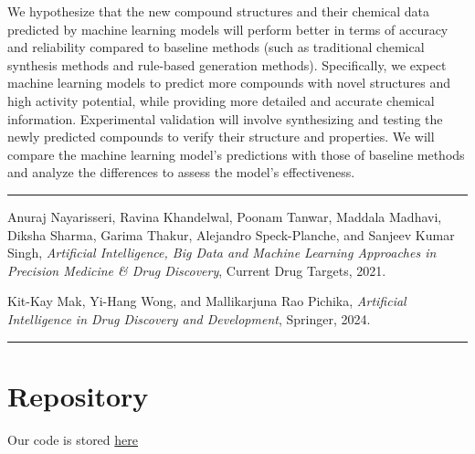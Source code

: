 \documentclass{ctexart}
\begin{document}
We hypothesize that the new compound structures and their chemical data predicted by machine learning models will perform better in terms of accuracy and reliability compared to baseline methods (such as traditional chemical synthesis methods and rule-based generation methods). Specifically, we expect machine learning models to predict more compounds with novel structures and high activity potential, while providing more detailed and accurate chemical information. Experimental validation will involve synthesizing and testing the newly predicted compounds to verify their structure and properties. We will compare the machine learning model’s predictions with those of baseline methods and analyze the differences to assess the model's effectiveness.
\vspace{1em}
\hrule
\begin{thebibliography}{9}

    Anuraj Nayarisseri, Ravina Khandelwal, Poonam Tanwar, Maddala Madhavi, Diksha Sharma, Garima Thakur, Alejandro Speck-Planche, and Sanjeev Kumar Singh,
    \textit{Artificial Intelligence, Big Data and Machine Learning Approaches in Precision Medicine \& Drug Discovery}, 
    Current Drug Targets, 2021.
    
    Kit-Kay Mak, Yi-Hang Wong, and Mallikarjuna Rao Pichika,
    \textit{Artificial Intelligence in Drug Discovery and Development}, 
    Springer, 2024.

\end{thebibliography}
\vspace{1em}
\hrule
\section{Repository}
Our code is stored \href{https://www.example.com}{here}
\end{document}
